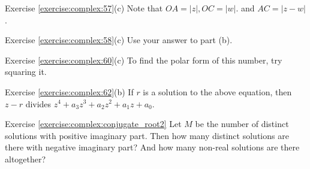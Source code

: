 \noindent Exercise \ref{exercise:complex:57}(c)
Note that $OA = |z|, OC = |w|.$ and $AC = |z-w|$.

\noindent Exercise \ref{exercise:complex:58}(c)
Use your answer to part (b).

\noindent Exercise \ref{exercise:complex:60}(c)
 To find the polar form of this number, try squaring it.

\noindent Exercise \ref{exercise:complex:62}(b)
If $r$ is a solution to the above equation, then $z-r$ divides  $z^4 + a_{3}z^{3} + a_{2} z^{2}+ a_1 z  + a_0$.

\noindent Exercise \ref{exercise:complex:conjugate_root2}
 Let $M$ be the number of distinct solutions with positive imaginary part. Then how many distinct solutions are there with negative imaginary part? And how many non-real solutions are there altogether?

